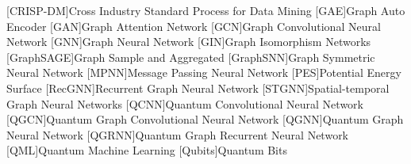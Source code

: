\begin{acronym}[TestTestTestTest]\itemsep=-3pt
    [CRISP-DM]{Cross Industry Standard Process for Data Mining}    
    [GAE]{Graph Auto Encoder}
    [GAN]{Graph Attention Network}
    [GCN]{Graph Convolutional Neural Network}
    [GNN]{Graph Neural Network}
    [GIN]{Graph Isomorphism Networks}
    [GraphSAGE]{Graph Sample and Aggregated}
    [GraphSNN]{Graph Symmetric Neural Network}
    [MPNN]{Message Passing Neural Network}
    [PES]{Potential Energy Surface}
    [RecGNN]{Recurrent Graph Neural Network}
    [STGNN]{Spatial-temporal Graph Neural Networks}
    [QCNN]{Quantum Convolutional Neural Network}
    [QGCN]{Quantum Graph Convolutional Neural Network}
    [QGNN]{Quantum Graph Neural Network}
    [QGRNN]{Quantum Graph Recurrent Neural Network}
    [QML]{Quantum Machine Learning}
    [Qubits]{Quantum Bits}

\end{acronym}